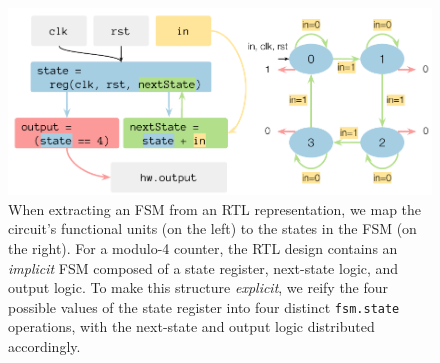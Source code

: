 \documentclass[acmsmall,screen,review]{acmart}
\begin{document}
\begin{figure}
  \includegraphics[width=0.8\columnwidth]{rtl-to-fsm.pdf}
    \caption{When extracting an FSM from an RTL representation, 
      we map the circuit's functional units (on the left) to the states in the FSM (on the right). For a modulo-4 counter, 
      the RTL design contains an \textit{implicit} FSM composed of a state register, next-state logic, and output logic.
      To make this structure \textit{explicit}, we reify the four possible values of the state register into four distinct \texttt{fsm.state} operations, with the next-state and output logic distributed accordingly.}
    \label{fig:fsm-extraction}
\end{figure}
\end{document}
